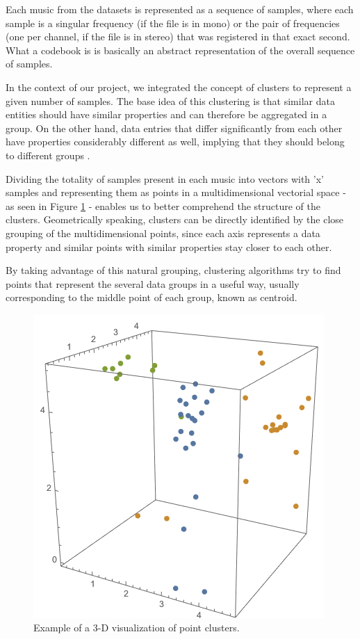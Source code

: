 \documentclass[12pt]{article}
\begin{document}
Each music from the datasets is represented as a sequence of samples, where each 
sample is a singular frequency (if the file is in mono) or the pair of frequencies 
(one per channel, if the file is in stereo) that was registered in that exact second.
What a codebook is is basically an abstract representation of the overall 
sequence of samples.

In the context of our project, we integrated the concept of clusters to represent 
a given number of samples.
The base idea of this clustering is that similar data entities should have similar 
properties and can therefore be aggregated in a group.
On the other hand, data entries that differ significantly from each other
have properties considerably different as well, implying that they should belong 
to different groups \cite{clustering}. 

\newpage
Dividing the totality of samples present in each music into vectors with 'x' 
samples and representing them as points in a multidimensional vectorial space -  
as seen in Figure \ref{fig:pointsEx} - enables us to better comprehend the 
structure of the clusters.  
Geometrically speaking, clusters can be directly identified by the close 
grouping of the multidimensional points, since each axis represents a data 
property and similar points with similar properties stay closer to each other. 

By taking advantage of this natural grouping, clustering algorithms try to find 
points that represent the several data groups in a useful way, usually 
corresponding to the middle point of each group, known as centroid.

\begin{figure}[H]
  \centering
  \begin{minipage}{\textwidth}
    \centering
    \includegraphics[width=0.4\linewidth]{pointsEx.png}
  \end{minipage}%
  \caption{Example of a 3-D visualization of point clusters.}
  \label{fig:pointsEx}
\end{figure}
\end{document}
